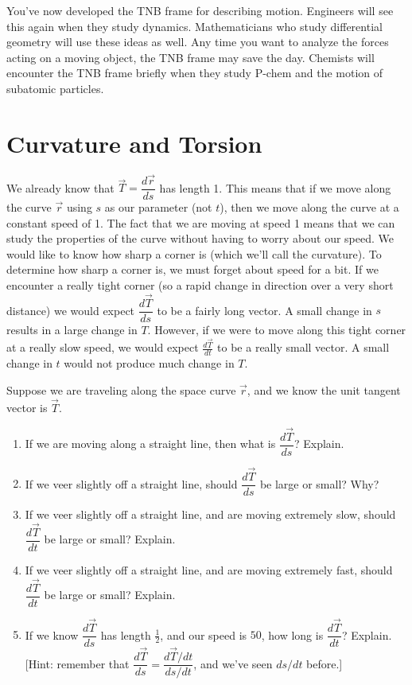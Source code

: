 You've now developed the TNB frame for describing motion. Engineers will see this again when they study dynamics. Mathematicians who study differential geometry will use these ideas as well. Any time you want to analyze the forces acting on a moving object, the TNB frame may save the day. Chemists will encounter the TNB frame briefly when they study P-chem and the motion of subatomic particles.

 
\section{Curvature and Torsion}

We already know that $\vec T=\dfrac{d\vec r}{ds}$ has length 1. This means that if we move along the curve $\vec r$ using $s$ as our parameter (not $t$), then we move along the curve at a constant speed of 1. The fact that we are moving at speed 1 means that we can study the properties of the curve without having to worry about our speed. We would like to know how sharp a corner is (which we'll call the curvature). To determine how sharp a corner is, we must forget about speed for a bit. If we encounter a really tight corner (so a rapid change in direction over a very short distance) we would expect $\dfrac{d\vec T}{ds}$ to be a fairly long vector. A small change in $s$ results in a large change in $T$. However, if we were to move along this tight corner at a really slow speed, we would expect $\frac{d\vec T}{dt}$ to be a really small vector. A small change in $t$ would not produce much change in $T$. 

\begin{problem}%
Suppose we are traveling along the space curve $\vec r$, and we know the unit tangent vector is $\vec T$. 
\begin{enumerate}
 \item If we are moving along a straight line, then what is $\dfrac{d\vec T}{ds}$? Explain.
 \item If we veer slightly off a straight line, should $\dfrac{d\vec T}{ds}$ be large or small? Why?
 \item If we veer slightly off a straight line, and are moving extremely slow, should $\dfrac{d\vec T}{dt}$ be large or small? Explain.
 \item If we veer slightly off a straight line, and are moving extremely fast, should $\dfrac{d\vec T}{dt}$ be large or small? Explain.
 \item If we know $\dfrac{d\vec T}{ds}$ has length $\frac{1}{2}$, and our speed is $50$, how long is $\dfrac{d\vec T}{dt}$? Explain. [Hint: remember that $\dfrac{d\vec T}{ds} = \dfrac{d\vec T/dt}{ds/dt}$, and we've seen $ds/dt$ before.]
\end{enumerate}
\end{problem}

